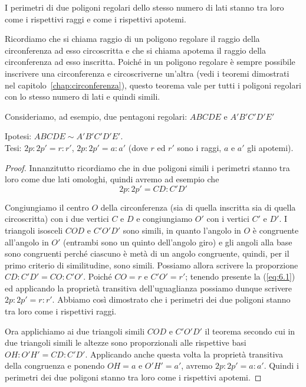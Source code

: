 \begin{teorema}
I perimetri di due poligoni regolari dello stesso numero di lati 
stanno tra loro come i rispettivi raggi e come i rispettivi apotemi.
\end{teorema}

Ricordiamo che si chiama raggio di un poligono regolare il raggio 
della circonferenza ad esso circoscritta e che si chiama apotema il 
raggio della circonferenza ad esso inscritta. Poiché in un poligono 
regolare è sempre possibile inscrivere una circonferenza e 
circoscriverne un'altra (vedi i teoremi dimostrati nel 
capitolo~\ref{chap:circonferenza}), questo teorema vale per tutti i 
poligoni regolari con lo stesso numero di lati e quindi simili.

Consideriamo, ad esempio, due pentagoni regolari: $ABCDE$ e 
$A'B'C'D'E'$

\noindent Ipotesi: $ABCDE\sim A'B'C'D'E'$.\\
Tesi: $2p : 2p' = r : r'$, $2p : 2p' = a : a'$ (dove $r$ ed $r'$ sono 
i raggi, $a$ e $a'$ gli apotemi).

\begin{center}
\scalebox{.8}{}
\end{center}


\begin{proof}
Innanzitutto ricordiamo che in due poligoni simili i perimetri stanno 
tra loro come due lati omologhi, quindi avremo ad esempio che
\begin{equation}\label{eq:6.1}
2p : 2p' = CD : C'D'
\end{equation}

Congiungiamo il centro $O$ della circonferenza (sia di quella 
inscritta sia di quella circoscritta) con i due vertici $C$ e $D$ e 
congiungiamo $O'$ con i vertici $C'$ e $D'$. I triangoli isosceli 
$COD$ e $C'O'D'$ sono simili, in quanto l'angolo in $O$ è congruente 
all'angolo in $O'$ (entrambi sono un quinto dell'angolo giro) e gli 
angoli alla base sono congruenti perché ciascuno è metà di un angolo 
congruente, quindi, per il primo criterio di similitudine, sono 
simili. Possiamo allora scrivere la proporzione $CD : C'D' = CO : 
C'O'$.
Poiché $CO = r$ e $C'O' = r'$; tenendo presente la (\ref{eq:6.1}) ed 
applicando la proprietà transitiva dell'uguaglianza possiamo dunque 
scrivere $2p : 2p' = r : r'$. Abbiamo così dimostrato che i perimetri 
dei due poligoni stanno tra loro come i rispettivi raggi.

Ora applichiamo ai due triangoli simili $COD$ e $C'O'D'$ il teorema 
secondo cui in due triangoli simili le altezze sono proporzionali 
alle rispettive basi $OH : O'H' = CD : C'D'$. Applicando anche questa 
volta la proprietà transitiva della congruenza e ponendo $OH = a$ e 
$O'H' =a'$, avremo $2p : 2p' = a : a'$.
Quindi i perimetri dei due poligoni stanno tra loro come i rispettivi 
apotemi.
\end{proof}

